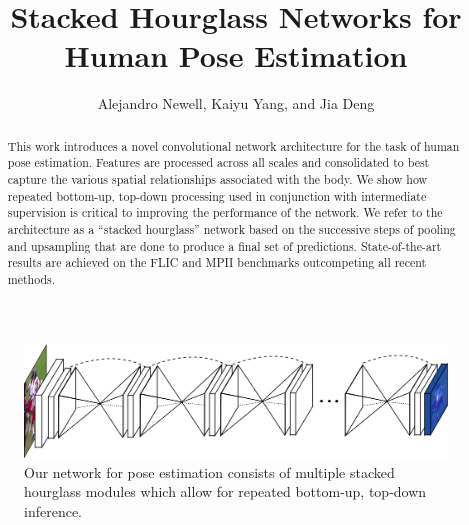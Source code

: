 \documentclass[runningheads]{llncs}
\begin{document}
\pagestyle{headings}
\mainmatter

\title{Stacked Hourglass Networks for \\ Human Pose Estimation}



\author{Alejandro Newell, Kaiyu Yang, and Jia Deng}

\maketitle

\begin{abstract}
  This work introduces a novel convolutional network architecture for
  the task of human pose estimation. Features are processed across all
  scales and consolidated to best capture the various spatial
  relationships associated with the body. We show how repeated
  bottom-up, top-down processing used in conjunction with intermediate
  supervision is critical to improving the performance of the
  network. We refer to the architecture as a ``stacked hourglass''
  network based on the successive steps of pooling and upsampling that
  are done to produce a final set of predictions. State-of-the-art
  results are achieved on the FLIC and MPII benchmarks outcompeting
  all recent methods.

\end{abstract}

\begin{figure}
\centering
\includegraphics[width=\textwidth, clip]{img/stacked-hg}
\caption{Our network for pose estimation consists of multiple stacked
  hourglass modules which allow for repeated bottom-up, top-down
  inference.}
\label{fig:stacked-hg}
\end{figure}

\end{document}
